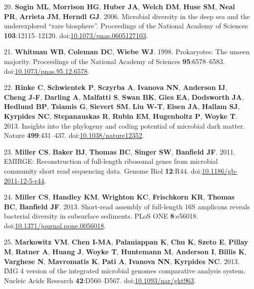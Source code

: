 \documentclass[11pt,]{article}
\begin{document}
\hypertarget{ref-Sogin2006}{}
20. \textbf{Sogin ML}, \textbf{Morrison HG}, \textbf{Huber JA},
\textbf{Welch DM}, \textbf{Huse SM}, \textbf{Neal PR}, \textbf{Arrieta
JM}, \textbf{Herndl GJ}. 2006. Microbial diversity in the deep sea and
the underexplored ``rare biosphere''. Proceedings of the National
Academy of Sciences \textbf{103}:12115--12120.
doi:\href{https://doi.org/10.1073/pnas.0605127103}{10.1073/pnas.0605127103}.

\hypertarget{ref-Whitman1998}{}
21. \textbf{Whitman WB}, \textbf{Coleman DC}, \textbf{Wiebe WJ}. 1998.
Prokaryotes: The unseen majority. Proceedings of the National Academy of
Sciences \textbf{95}:6578--6583.
doi:\href{https://doi.org/10.1073/pnas.95.12.6578}{10.1073/pnas.95.12.6578}.

\hypertarget{ref-Rinke2013}{}
22. \textbf{Rinke C}, \textbf{Schwientek P}, \textbf{Sczyrba A},
\textbf{Ivanova NN}, \textbf{Anderson IJ}, \textbf{Cheng J-F},
\textbf{Darling A}, \textbf{Malfatti S}, \textbf{Swan BK}, \textbf{Gies
EA}, \textbf{Dodsworth JA}, \textbf{Hedlund BP}, \textbf{Tsiamis G},
\textbf{Sievert SM}, \textbf{Liu W-T}, \textbf{Eisen JA}, \textbf{Hallam
SJ}, \textbf{Kyrpides NC}, \textbf{Stepanauskas R}, \textbf{Rubin EM},
\textbf{Hugenholtz P}, \textbf{Woyke T}. 2013. Insights into the
phylogeny and coding potential of microbial dark matter. Nature
\textbf{499}:431--437.
doi:\href{https://doi.org/10.1038/nature12352}{10.1038/nature12352}.

\hypertarget{ref-Miller2011}{}
23. \textbf{Miller CS}, \textbf{Baker BJ}, \textbf{Thomas BC},
\textbf{Singer SW}, \textbf{Banfield JF}. 2011. EMIRGE: Reconstruction
of full-length ribosomal genes from microbial community short read
sequencing data. Genome Biol \textbf{12}:R44.
doi:\href{https://doi.org/10.1186/gb-2011-12-5-r44}{10.1186/gb-2011-12-5-r44}.

\hypertarget{ref-Miller2013}{}
24. \textbf{Miller CS}, \textbf{Handley KM}, \textbf{Wrighton KC},
\textbf{Frischkorn KR}, \textbf{Thomas BC}, \textbf{Banfield JF}. 2013.
Short-read assembly of full-length 16S amplicons reveals bacterial
diversity in subsurface sediments. PLoS ONE \textbf{8}:e56018.
doi:\href{https://doi.org/10.1371/journal.pone.0056018}{10.1371/journal.pone.0056018}.

\hypertarget{ref-Markowitz2013}{}
25. \textbf{Markowitz VM}, \textbf{Chen I-MA}, \textbf{Palaniappan K},
\textbf{Chu K}, \textbf{Szeto E}, \textbf{Pillay M}, \textbf{Ratner A},
\textbf{Huang J}, \textbf{Woyke T}, \textbf{Huntemann M},
\textbf{Anderson I}, \textbf{Billis K}, \textbf{Varghese N},
\textbf{Mavromatis K}, \textbf{Pati A}, \textbf{Ivanova NN},
\textbf{Kyrpides NC}. 2013. IMG 4 version of the integrated microbial
genomes comparative analysis system. Nucleic Acids Research
\textbf{42}:D560--D567.
doi:\href{https://doi.org/10.1093/nar/gkt963}{10.1093/nar/gkt963}.
\end{document}
